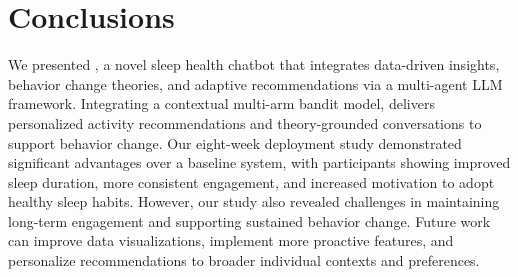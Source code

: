 \section{Conclusions}
We presented \name{}, a novel sleep health chatbot that integrates data-driven insights, behavior change theories, and adaptive recommendations via a multi-agent LLM framework. 
Integrating a contextual multi-arm bandit model, \name{} delivers personalized activity recommendations and theory-grounded conversations to support behavior change. 
Our eight-week deployment study demonstrated significant advantages over a baseline system, with participants showing improved sleep duration, more consistent engagement, and increased motivation to adopt healthy sleep habits.
However, our study also revealed challenges in maintaining long-term engagement and supporting sustained behavior change. 
Future work can improve data visualizations, implement more proactive features, and personalize recommendations to broader individual contexts and preferences.
